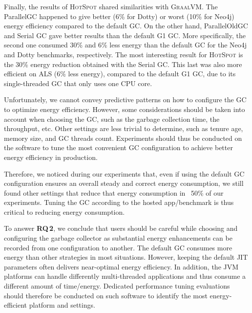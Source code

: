 Finally, the results of \textsc{HotSpot} shared similarities with \textsc{GraalVM}.
The \textsf{ParallelGC} happened to give better (6\% for \textsf{Dotty}) or worst (10\% for \textsf{Neo4j}) energy efficiency compared to the default GC.
On the other hand, \textsf{ParallelOldGC} and \textsf{Serial} GC gave better results than the default G1 GC.
More specifically, the second one consumed 30\% and 6\% less energy than the default GC for the \textsf{Neo4j} and \textsf{Dotty} benchmarks, respectively.
The most interesting result for \textsc{HotSpot} is the 30\% energy reduction obtained with the \textsf{Serial} GC.
This last was also more efficient on ALS (6\% less energy), compared to the default G1 GC, due to its single-threaded GC that only uses one CPU core.

Unfortunately, we cannot convey predictive patterns on how to configure the GC to optimize energy efficiency.
However, some considerations should be taken into account when choosing the GC, such as the garbage collection time, the throughput, etc.
Other settings are less trivial to determine, such as tenure age, memory size, and GC threads count.
Experiments should thus be conducted on the software to tune the most convenient GC configuration to achieve better energy efficiency in production.

Therefore, we noticed during our experiments that, even if using the default GC configuration ensures an overall steady and correct energy consumption, we still found other settings that reduce that energy consumption in ~50\% of our experiments.
Tuning the GC according to the hosted app/benchmark is thus critical to reducing energy consumption.

\bigbreak
\begin{mdframed}[]
    To answer \textbf{RQ\,2}, we conclude that users should be careful while choosing and configuring the garbage collector as substantial energy enhancements can be recorded from one configuration to another.
    The default GC consumes more energy than other strategies in most situations.
    However, keeping the default JIT parameters often delivers near-optimal energy efficiency.
    In addition, the JVM platforms can handle differently multi-threaded applications and thus consume a different amount of time/energy.
    Dedicated performance tuning evaluations should therefore be conducted on such software to identify the most energy-efficient platform and settings.
\end{mdframed}


